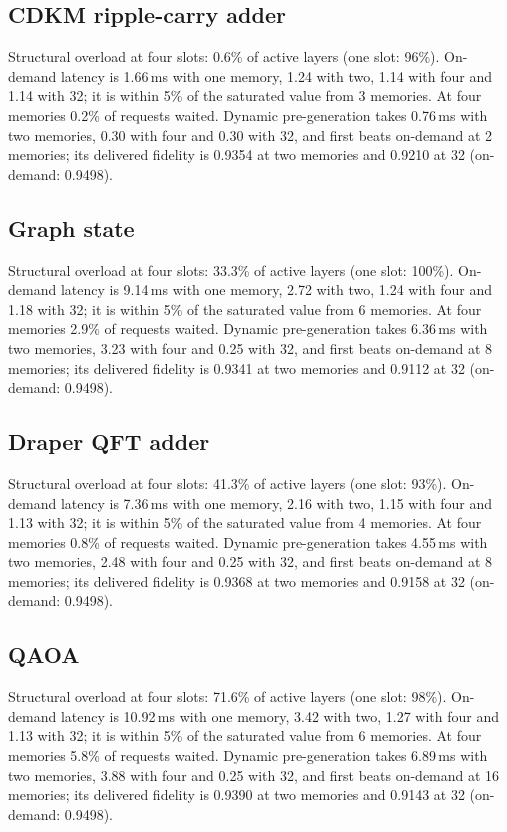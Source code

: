 \subsection*{CDKM ripple-carry adder}
Structural overload at four slots: 0.6\% of active layers (one slot: 96\%). On-demand latency is 1.66\,ms with one memory, 1.24 with two, 1.14 with four and 1.14 with 32; it is within 5\% of the saturated value from 3 memories. At four memories 0.2\% of requests waited. Dynamic pre-generation takes 0.76\,ms with two memories, 0.30 with four and 0.30 with 32, and first beats on-demand at 2 memories; its delivered fidelity is 0.9354 at two memories and 0.9210 at 32 (on-demand: 0.9498).

\subsection*{Graph state}
Structural overload at four slots: 33.3\% of active layers (one slot: 100\%). On-demand latency is 9.14\,ms with one memory, 2.72 with two, 1.24 with four and 1.18 with 32; it is within 5\% of the saturated value from 6 memories. At four memories 2.9\% of requests waited. Dynamic pre-generation takes 6.36\,ms with two memories, 3.23 with four and 0.25 with 32, and first beats on-demand at 8 memories; its delivered fidelity is 0.9341 at two memories and 0.9112 at 32 (on-demand: 0.9498).

\subsection*{Draper QFT adder}
Structural overload at four slots: 41.3\% of active layers (one slot: 93\%). On-demand latency is 7.36\,ms with one memory, 2.16 with two, 1.15 with four and 1.13 with 32; it is within 5\% of the saturated value from 4 memories. At four memories 0.8\% of requests waited. Dynamic pre-generation takes 4.55\,ms with two memories, 2.48 with four and 0.25 with 32, and first beats on-demand at 8 memories; its delivered fidelity is 0.9368 at two memories and 0.9158 at 32 (on-demand: 0.9498).

\subsection*{QAOA}
Structural overload at four slots: 71.6\% of active layers (one slot: 98\%). On-demand latency is 10.92\,ms with one memory, 3.42 with two, 1.27 with four and 1.13 with 32; it is within 5\% of the saturated value from 6 memories. At four memories 5.8\% of requests waited. Dynamic pre-generation takes 6.89\,ms with two memories, 3.88 with four and 0.25 with 32, and first beats on-demand at 16 memories; its delivered fidelity is 0.9390 at two memories and 0.9143 at 32 (on-demand: 0.9498).

